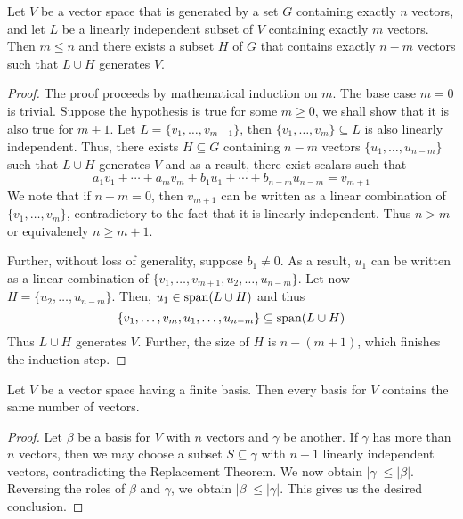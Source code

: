 \begin{theorem}
    Let $V$ be a vector space that is generated by a set $G$ containing exactly $n$ vectors, and let $L$ be a linearly independent subset of $V$ containing exactly $m$ vectors. Then $m\le n$ and there exists a subset $H$ of $G$ that contains exactly $n - m$ vectors such that $L\cup H$ generates $V$.
\end{theorem}
\begin{proof}
    The proof proceeds by mathematical induction on $m$. The base case $m = 0$ is trivial. Suppose the hypothesis is true for some $m\ge 0$, we shall show that it is also true for $m + 1$. Let $L = \{v_1,\ldots, v_{m + 1}\}$, then $\{v_1,\ldots,v_m\}\subseteq L$ is also linearly independent. Thus, there exists $H\subseteq G$ containing $n - m$ vectors $\{u_1,\ldots,u_{n - m}\}$ such that $L\cup H$ generates $V$ and as a result, there exist scalars such that 
    \begin{equation*}
        a_1v_1 + \cdots + a_mv_m + b_1u_1 + \cdots + b_{n - m}u_{n - m} = v_{m + 1}
    \end{equation*}
    We note that if $n - m = 0$, then $v_{m + 1}$ can be written as a linear combination of $\{v_1,\ldots,v_m\}$, contradictory to the fact that it is linearly independent. Thus $n > m$ or equivalenely $n\ge m + 1$.

    Further, without loss of generality, suppose $b_1\ne0$. As a result, $u_1$ can be written as a linear combination of $\{v_1,\ldots,v_{m + 1}, u_2,\ldots,u_{n - m}\}$. Let now $H = \{u_2,\ldots,u_{n - m}\}$. Then, $u_1\in\operatorname{span}(L\cup H)$ and thus
    \begin{equation*}
        \{v_1,\ldots,v_m,u_1,\ldots,u_{n - m}\}\subseteq\operatorname{span}(L\cup H)
    \end{equation*}
    Thus $L\cup H$ generates $V$. Further, the size of $H$ is $n - (m + 1)$, which finishes the induction step.
\end{proof}

\begin{corollary}
    Let $V$ be a vector space having a finite basis. Then every basis for $V$ contains the same number of vectors.
\end{corollary}
\begin{proof}
    Let $\beta$ be a basis for $V$ with $n$ vectors and $\gamma$ be another. If $\gamma$ has more than $n$ vectors, then we may choose a subset $S\subseteq\gamma$ with $n + 1$ linearly independent vectors, contradicting the Replacement Theorem. We now obtain $|\gamma|\le|\beta|$. Reversing the roles of $\beta$ and $\gamma$, we obtain $|\beta|\le|\gamma|$. This gives us the desired conclusion.
\end{proof}

